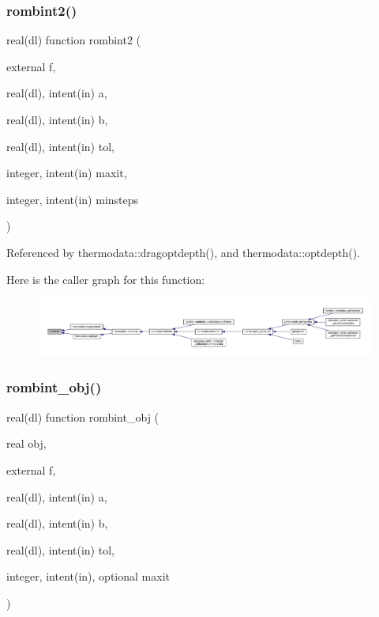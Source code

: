\subsubsection{\texorpdfstring{rombint2()}{rombint2()}}
{\footnotesize\ttfamily real(dl) function rombint2 (\begin{DoxyParamCaption}\item[{external}]{f,  }\item[{real(dl), intent(in)}]{a,  }\item[{real(dl), intent(in)}]{b,  }\item[{real(dl), intent(in)}]{tol,  }\item[{integer, intent(in)}]{maxit,  }\item[{integer, intent(in)}]{minsteps }\end{DoxyParamCaption})}



Referenced by thermodata\+::dragoptdepth(), and thermodata\+::optdepth().

Here is the caller graph for this function\+:
\nopagebreak
\begin{figure}[H]
\begin{center}
\leavevmode
\includegraphics[width=350pt]{subroutines_8f90_a9b3be772ea91c10f9c682519e5e8bf1d_icgraph}
\end{center}
\end{figure}
\mbox{\label{subroutines_8f90_a5f7d81c89595cb6ea60a221b1d9da0f5}} 
\subsubsection{\texorpdfstring{rombint\+\_\+obj()}{rombint\_obj()}}
{\footnotesize\ttfamily real(dl) function rombint\+\_\+obj (\begin{DoxyParamCaption}\item[{real}]{obj,  }\item[{external}]{f,  }\item[{real(dl), intent(in)}]{a,  }\item[{real(dl), intent(in)}]{b,  }\item[{real(dl), intent(in)}]{tol,  }\item[{integer, intent(in), optional}]{maxit }\end{DoxyParamCaption})}

